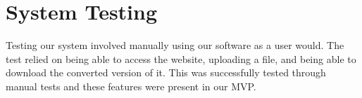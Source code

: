 
\section{System Testing}
Testing our system involved manually using our software as a user would.
The test relied on being able to access the website, uploading a file, and being able to download the converted version of it.
This was successfully tested through manual tests and these features were present in our MVP.